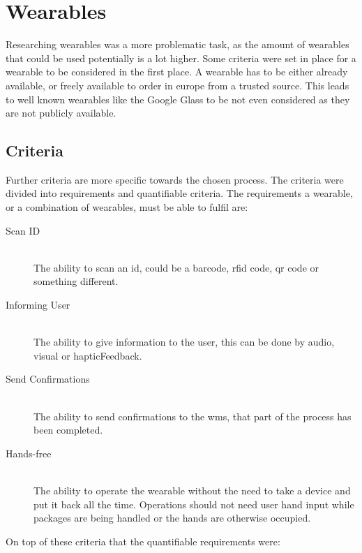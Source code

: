 \section{Wearables}\label{sec:wearables}
Researching wearables was a more problematic task, as the amount of wearables that could be used potentially is a lot higher. Some criteria were set in place for a wearable to be considered in the first place. A wearable has to be either already available, or freely available to order in europe from a trusted source. This leads to well known wearables like the Google Glass to be not even considered as they are not publicly available.

\subsection{Criteria}

Further criteria are more specific towards the chosen process. The criteria were divided into requirements and quantifiable criteria. The requirements a wearable, or a combination of wearables, must be able to fulfil are:
\begin{description}
	\item[Scan ID] \hfill \\
		The ability to scan an \gls{id}, could be a barcode, \gls{rfid} code, \gls{qr} code or something different.
	\item[Informing User] \hfill \\
		The ability to give information to the user, this can be done by audio, visual or \gls{hapticFeedback}. 
	\item[Send Confirmations] \hfill \\
		The ability to send confirmations to the \gls{wms}, that part of the process has been completed.
	\item[Hands-free] \hfill \\
		The ability to operate the wearable without the need to take a device and put it back all the time. Operations should not need user hand input while packages are being handled or the hands are otherwise occupied.
\end{description}

On top of these criteria that the quantifiable requirements were:

